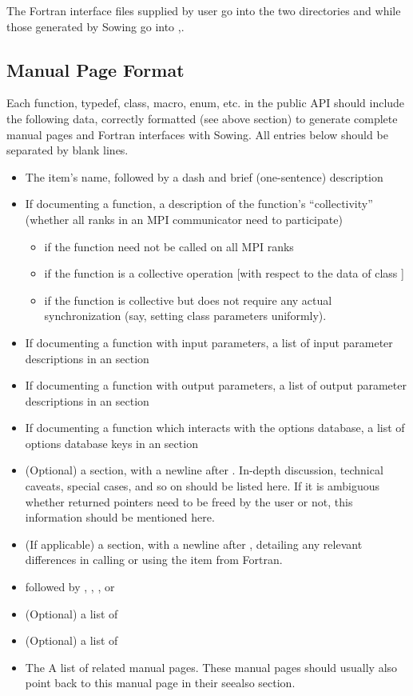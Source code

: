 The Fortran interface files supplied by user go into the two directories   and  while those generated by Sowing go into ,.

\subsection{Manual Page Format}
Each function, typedef, class, macro, enum, etc. in the public API should include the following data, correctly formatted
(see above section) to generate complete manual pages and Fortran interfaces with Sowing. 
All entries below should be separated by blank lines.
\begin{itemize}
  \item The item's name, followed by a dash and brief (one-sentence) description
  \item If documenting a function, a description of the function's ``collectivity'' (whether all ranks in an MPI communicator need to participate)
    \begin{itemize}
    \item {} if the function need not be called on all MPI ranks
    \item {} if the function is a collective operation [with respect to the data of class ]
    \item {} if the function is collective but does not require any actual synchronization (say, setting class parameters uniformly).
    \end{itemize}
  \item If documenting a function with input parameters, a list of input parameter descriptions in an  section
  \item If documenting a function with output parameters, a list of output parameter descriptions in an  section
  \item If documenting a function which interacts with the options database, a list of options database keys in an  section
  \item (Optional) a  section, with a newline after . In-depth discussion, technical caveats, special cases, and so on should be listed here. 
    If it is ambiguous whether returned pointers need to be freed by the user or not, this information should be mentioned here.
  \item (If applicable) a  section, with a newline after , detailing any relevant differences in calling or using the item from Fortran.
  \item {} followed by , , , or 
  \item (Optional) a list of 
  \item (Optional) a list of 
  \item The  A list of related manual pages. These manual pages should usually also point back to this manual page in their seealso section.
\end{itemize}

